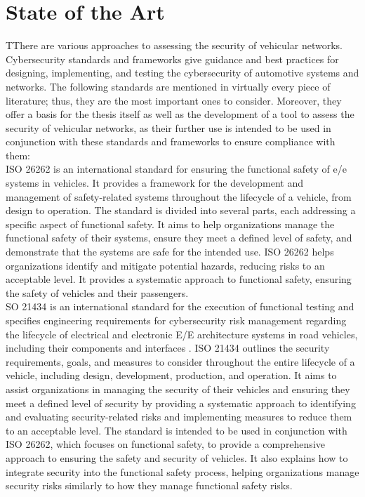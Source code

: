 \chapter{State of the Art}
\label{chp:stateoftheart}

TThere are various approaches to assessing the security of vehicular networks. Cybersecurity standards and frameworks give guidance and best practices for designing, implementing, and testing the cybersecurity of automotive systems and networks. 
The following standards are mentioned in virtually every piece of literature; thus, they are the most important ones to consider. 
Moreover, they offer a basis for the thesis itself as well as the development of a tool to assess the security of vehicular networks,
as their further use is intended to be used in conjunction with these standards and frameworks to ensure compliance with them:\\

ISO 26262 is an international standard for ensuring the functional safety of \gls{e/e} systems in vehicles. 
It provides a framework for the development and management of safety-related systems throughout the lifecycle of a vehicle, from design to operation.
The standard is divided into several parts, each addressing a specific aspect of functional safety. 
It aims to help organizations manage the functional safety of their systems, ensure they meet a defined level of safety, and demonstrate that the systems are safe for the intended use.
ISO 26262 helps organizations identify and mitigate potential hazards, reducing risks to an acceptable level. 
It provides a systematic approach to functional safety, ensuring the safety of vehicles and their passengers.\\

SO 21434 is an international standard for the execution of functional testing and specifies engineering requirements for cybersecurity risk 
management regarding the lifecycle of electrical and electronic E/E architecture systems in road vehicles, including their components and interfaces \cite{iso21434}.
ISO 21434 outlines the security requirements, goals, and measures to consider throughout the entire lifecycle of a vehicle, including design, development, production, and operation. 
It aims to assist organizations in managing the security of their vehicles and ensuring they meet a defined level of security by providing a systematic approach to identifying and evaluating security-related risks and implementing measures to reduce them to an acceptable level. 
The standard is intended to be used in conjunction with ISO 26262, which focuses on functional safety, to provide a comprehensive approach to ensuring the safety and security of vehicles. 
It also explains how to integrate security into the functional safety process, helping organizations manage security risks similarly to how they manage functional safety risks.\\

